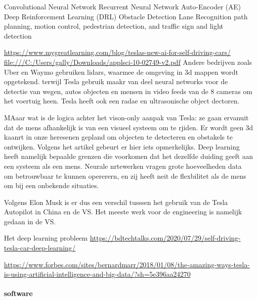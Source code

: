 \documentclass{article}
\begin{document}
Convolutional Neural Network
Recurrent Neural Network
Auto-Encoder (AE)
Deep Reinforcement Learning (DRL)
Obstacle Detection
Lane Recognition
path planning, motion control, pedestrian detection,
and traffic sign and light detection

\url{https://www.mygreatlearning.com/blog/teslas-new-ai-for-self-driving-cars/}
\url{file:///C:/Users/gally/Downloads/applsci-10-02749-v2.pdf}
Andere bedrijven zoals Uber en Waymo gebruiken lidars, waarmee de omgeving in 3d mappen wordt opgetekend. terwijl Tesla gebruik maakr van deel neural networks voor de detectie van wegen, autos objecten en mensen in video feeds van de 8 cameras om het voertuig heen. Tesla heeft ook een radae en ultrasonische object dectoren.

MAaar wat is de logica achter het vison-only aanpak van Tesla: ze gaan ervanuit dat de mens afhankelijk is van een visueel systeem om te rjiden. Er wordt geen 3d kaanrt in onze heresenen gepland om objecten  te detecteren en obstakels te ontwijken. Volgens het artikel gebeurt er hier iets opmerkelijks. Deep learning heeft namelijk bepaalde grenzen die voorkomen dat het dezelfde duiding geeft aan een systeem als een mens. Neurale nrtewerken vragen grote hoeveelheden data om betrouwbaar te kunnen opererern, en zij heeft neit de flexbilitet als de mens om bij een onbekende  situaties.

Volgens Elon Musk is er dus een verschil tusssen het gebruik van de Tesla Autopilot in China en de VS. Het meeste werk voor de engineering is namelijk gedaan in de VS.


Het deep learning probleem
\url{https://bdtechtalks.com/2020/07/29/self-driving-tesla-car-deep-learning/}

\url{https://www.forbes.com/sites/bernardmarr/2018/01/08/the-amazing-ways-tesla-is-using-artificial-intelligence-and-big-data/?sh=5e396aa24270}




\paragraph{software}
\end{document}
